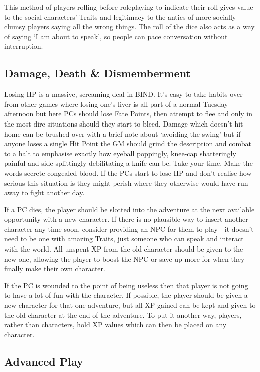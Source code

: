 \begin{multicols}{2}
This method of players rolling before roleplaying to indicate their roll gives value to the social characters' Traits and legitimacy to the antics of more socially clumsy players saying all the wrong things.  The roll of the dice also acts as a way of saying `I am about to speak', so people can pace conversation without interruption.

\subsection{Damage, Death \& Dismemberment}

Losing HP is a massive, screaming deal in BIND.  It's easy to take habits over from other games where losing one's liver is all part of a normal Tuesday afternoon but here PCs should lose Fate Points, then attempt to flee and only in the most dire situations should they start to bleed.  Damage which doesn't hit home can be brushed over with a brief note about `avoiding the swing' but if anyone loses a single Hit Point the GM should grind the description and combat to a halt to emphasise exactly how eyeball poppingly, knee-cap shatteringly painful and side-splittingly debilitating a knife can be.  Take your time.  Make the words secrete congealed blood.  If the PCs start to lose HP and don't realise how serious this situation is they might perish where they otherwise would have run away to fight another day.

If a PC dies, the player should be slotted into the adventure at the next available opportunity with a new character. If there is no plausible way to insert another character any time soon, consider providing an NPC for them to play - it doesn't need to be one with amazing Traits, just someone who can speak and interact with the world.  All unspent XP from the old character should be given to the new one, allowing the player to boost the NPC or save up more for when they finally make their own character.

If the PC is wounded to the point of being useless then that player is not going to have a lot of fun with the character. If possible, the player should be given a new character for that one adventure, but all XP gained can be kept and given to the old character at the end of the adventure.
To put it another way, players, rather than characters, hold XP values which can then be placed on any character.

\subsection{Advanced Play}


\end{multicols}
